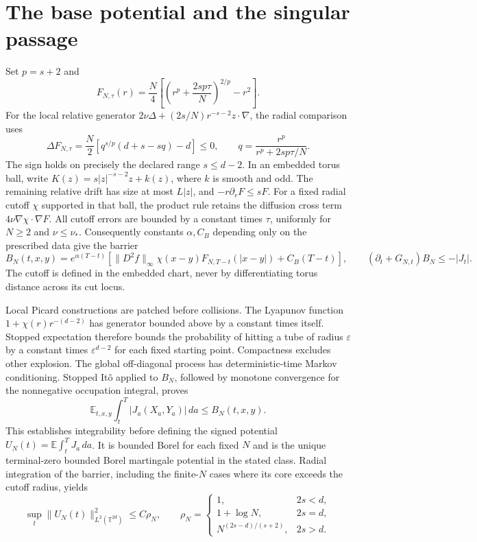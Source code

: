 \documentclass[10pt]{article}
\newcommand{\T}{\mathbb T}
\newcommand{\E}{\mathbb E}
\newcommand{\norm}[1]{\lVert #1\rVert}
\begin{document}
\section*{The base potential and the singular passage}
Set $p=s+2$ and
\[
 F_{N,\tau}(r)=\frac N4\left[\left(r^p+\frac{2sp\tau}{N}\right)^{2/p}-r^2\right].
\]
For the local relative generator $2\nu\Delta+(2s/N)r^{-s-2}z\cdot\nabla$,
the radial comparison uses
\[
 \Delta F_{N,\tau}=\frac N2\left[q^{s/p}(d+s-sq)-d\right]\le0,
 \qquad q=\frac{r^p}{r^p+2sp\tau/N}.
\]
The sign holds on precisely the declared range $s\le d-2$. In an embedded
torus ball, write $K(z)=s|z|^{-s-2}z+k(z)$, where $k$ is smooth and odd.
The remaining relative drift has size at most $L|z|$, and
$-r\partial_rF\le sF$. For a fixed radial cutoff $\chi$ supported in that ball,
the product rule retains the diffusion cross term
$4\nu\nabla\chi\cdot\nabla F$. All cutoff errors are bounded by a constant
times $\tau$, uniformly for $N\ge2$ and $\nu\le\nu_*$. Consequently constants
$\alpha,C_B$ depending only on the prescribed data give the barrier
\[
 B_N(t,x,y)=e^{\alpha(T-t)}
 \left[\norm{D^2f}_{\infty}\chi(x-y)F_{N,T-t}(|x-y|)+C_B(T-t)\right],
 \qquad (\partial_t+G_{N,t})B_N\le-|J_t|.
\]
The cutoff is defined in the embedded chart, never by differentiating torus
distance across its cut locus.

Local Picard constructions are patched before collisions. The Lyapunov function
$1+\chi(r)r^{-(d-2)}$ has generator bounded above by a constant times itself.
Stopped expectation therefore bounds the probability of hitting
a tube of radius $\varepsilon$ by a constant times $\varepsilon^{d-2}$ for
each fixed starting point. Compactness excludes other explosion. The global
off-diagonal process has deterministic-time Markov conditioning. Stopped
It\^o applied to $B_N$, followed by monotone convergence for the nonnegative
occupation integral, proves
\[
 \E_{t,x,y}\int_t^T|J_a(X_a,Y_a)|\,da\le B_N(t,x,y).
\]
This establishes integrability before defining the signed potential
$U_N(t)=\E\int_t^T J_a\,da$. It is bounded Borel for each fixed $N$ and is
the unique terminal-zero bounded Borel martingale potential in the stated class.
Radial integration of the barrier, including the finite-$N$ cases where its
core exceeds the cutoff radius, yields
\[
 \sup_t\norm{U_N(t)}_{L^2(\T^{2d})}^2\le C\rho_N,\qquad
 \rho_N=\begin{cases}
 1,&2s<d,\\
 1+\log N,&2s=d,\\
 N^{(2s-d)/(s+2)},&2s>d.
 \end{cases}
\]
\end{document}
